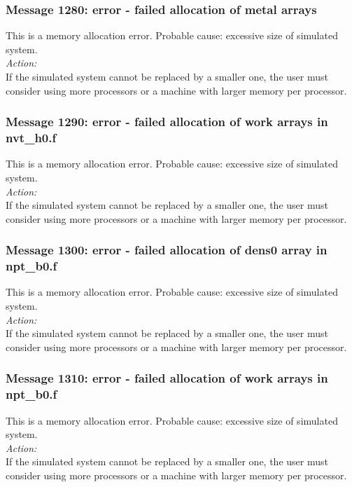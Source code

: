 \subsubsection*{Message 1280: error - failed allocation of metal
arrays}

This is a memory allocation error. Probable cause: excessive size of
simulated system. \\

\noindent
{\em Action:}\\
If the simulated system cannot be replaced by a smaller one, the user
must consider using more processors or a machine with larger memory
per processor.

\subsubsection*{Message 1290: error - failed allocation of work arrays
in nvt\_h0.f}

This is a memory allocation error. Probable cause: excessive size of
simulated system. \\

\noindent
{\em Action:}\\
If the simulated system cannot be replaced by a smaller one, the user
must consider using more processors or a machine with larger memory
per processor.

\subsubsection*{Message 1300: error - failed allocation of dens0 array
in npt\_b0.f}

This is a memory allocation error. Probable cause: excessive size of
simulated system. \\

\noindent
{\em Action:}\\
If the simulated system cannot be replaced by a smaller one, the user
must consider using more processors or a machine with larger memory
per processor.

\subsubsection*{Message 1310: error - failed allocation of work arrays
in npt\_b0.f}

This is a memory allocation error. Probable cause: excessive size of
simulated system. \\

\noindent
{\em Action:}\\
If the simulated system cannot be replaced by a smaller one, the user
must consider using more processors or a machine with larger memory
per processor.


